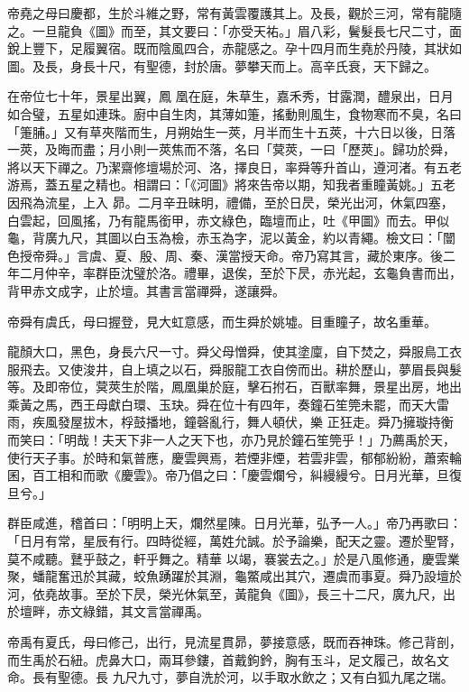\begin{pinyinscope}
 帝堯之母曰慶都，生於斗維之野，常有黃雲覆護其上。及長，觀於三河，常有龍隨之。一旦龍負《圖》而至，其文要曰：「亦受天祐。」眉八彩，鬢髮長七尺二寸，面銳上豐下，足履翼宿。既而陰風四合，赤龍感之。孕十四月而生堯於丹陵，其狀如圖。及長，身長十尺，有聖德，封於唐。夢攀天而上。高辛氏衰，天下歸之。



 在帝位七十年，景星出翼，鳳
 凰在庭，朱草生，嘉禾秀，甘露潤，醴泉出，日月如合璧，五星如連珠。廚中自生肉，其薄如箑，搖動則風生，食物寒而不臭，名曰「箑脯。」又有草夾階而生，月朔始生一莢，月半而生十五莢，十六日以後，日落一莢，及晦而盡；月小則一莢焦而不落，名曰「蓂莢，一曰「歷莢」。歸功於舜，將以天下禪之。乃潔齋修壇場於河、洛，擇良日，率舜等升首山，遵河渚。有五老游焉，蓋五星之精也。相謂曰：「《河圖》將來告帝以期，知我者重瞳黃姚。」五老因飛為流星，上入
 昴。二月辛丑昧明，禮備，至於日昃，榮光出河，休氣四塞，白雲起，回風搖，乃有龍馬銜甲，赤文綠色，臨壇而止，吐《甲圖》而去。甲似龜，背廣九尺，其圖以白玉為檢，赤玉為字，泥以黃金，約以青繩。檢文曰：「闓色授帝舜。」言虞、夏、殷、周、秦、漢當授天命。帝乃寫其言，藏於東序。後二年二月仲辛，率群臣沈璧於洛。禮畢，退俟，至於下昃，赤光起，玄龜負書而出，背甲赤文成字，止於壇。其書言當禪舜，遂讓舜。



 帝舜有虞氏，母曰握登，見大虹意感，而生舜於姚墟。目重瞳子，故名重華。



 龍顏大口，黑色，身長六尺一寸。舜父母憎舜，使其塗廩，自下焚之，舜服鳥工衣服飛去。又使浚井，自上填之以石，舜服龍工衣自傍而出。耕於歷山，夢眉長與髮等。及即帝位，蓂莢生於階，鳳凰巢於庭，擊石拊石，百獸率舞，景星出房，地出乘黃之馬，西王母獻白環、玉玦。舜在位十有四年，奏鐘石笙筦未罷，而天大雷雨，疾風發屋拔木，桴鼓播地，鐘磬亂行，舞人頓伏，樂
 正狂走。舜乃擁璇持衡而笑曰：「明哉！夫天下非一人之天下也，亦乃見於鐘石笙筦乎！」乃薦禹於天，使行天子事。於時和氣普應，慶雲興焉，若煙非煙，若雲非雲，郁郁紛紛，蕭索輪囷，百工相和而歌《慶雲》。帝乃倡之曰：「慶雲爛兮，糾縵縵兮。日月光華，旦復旦兮。」



 群臣咸進，稽首曰：「明明上天，爛然星陳。日月光華，弘予一人。」帝乃再歌曰：「日月有常，星辰有行。四時從經，萬姓允誠。於予論樂，配天之靈。遷於聖腎，莫不咸聽。鼚乎鼓之，軒乎舞之。精華
 以竭，褰裳去之。」於是八風修通，慶雲業聚，蟠龍奮迅於其藏，蛟魚踴躍於其淵，龜鱉咸出其穴，遷虞而事夏。舜乃設壇於河，依堯故事。至於下昃，榮光休氣至，黃龍負《圖》，長三十二尺，廣九尺，出於壇畔，赤文綠錯，其文言當禪禹。



 帝禹有夏氏，母曰修己，出行，見流星貫昴，夢接意感，既而吞神珠。修己背剖，而生禹於石紐。虎鼻大口，兩耳參鏤，首戴鉤鈐，胸有玉斗，足文履己，故名文命。長有聖德。長
 九尺九寸，夢自洗於河，以手取水飲之；又有白狐九尾之瑞。




\end{pinyinscope}
